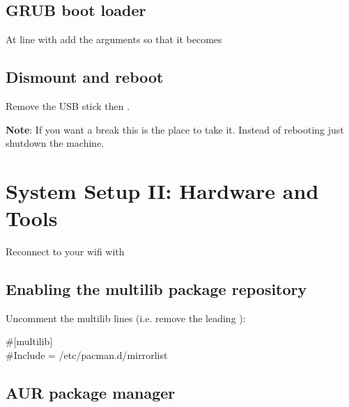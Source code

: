 
\subsection{GRUB boot loader}

\begin{blocksection}
	At line with  add the arguments so that it becomes\\
\end{blocksection}

\subsection{Dismount and reboot}


Remove the USB stick then .

\textbf{Note}: If you want a break this is the place to take it. Instead of rebooting just shutdown the machine.

\section{System Setup II: Hardware and Tools}

Reconnect to your wifi with 

\subsection{Enabling the multilib package repository}

\begin{blocksection}
	Uncomment the multilib lines (i.e. remove the leading \code{\#}):
	\begin{codeblock}
		\#[multilib]\\
		\#Include = /etc/pacman.d/mirrorlist
	\end{codeblock}
\end{blocksection}

\subsection{AUR package manager}

